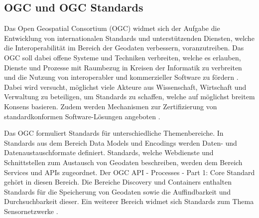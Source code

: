 \subsection{OGC und OGC Standards}
Das Open Geospatial Consortium (OGC) widmet sich der Aufgabe die Entwicklung von internationalen Standards und unterstützenden Diensten, welche die Interoperabilität im 
Bereich der Geodaten verbessern, voranzutreiben. Das OGC soll dabei offene Systeme und Techniken verbreiten, welche es erlauben, Dienste und Prozesse mit Raumbezug
in Kreisen der Informatik zu verbreiten und die Nutzung von interoperabler und kommerzieller Software zu fördern \cite{ogc_bylaws}. Dabei wird versucht, möglichst viele
Akteure aus Wissenschaft, Wirtschaft und Verwaltung zu beteiligen, um Standards zu schaffen, welche auf möglichst breitem Konsens basieren. Zudem werden 
Mechanismen zur Zertifizierung von standardkonformen Software-Lösungen angeboten \cite{ogc_bylaws}.

Das OGC formuliert Standards für unterschiedliche Themenbereiche. In Standards aus dem Bereich Data Models und Encodings werden Daten- und Datenaustauschformate
definiert. Standards, welche Webdienste und Schnittstellen zum Austausch von Geodaten beschreiben, werden dem Bereich Services und APIs zugeordnet. 
Der OGC API - Processes - Part 1: Core Standard gehört in diesen Bereich. Die Bereiche Discovery und Containers enthalten Standards für die Speicherung von Geodaten
sowie die Auffindbarkeit und Durchsuchbarkeit dieser. Ein weiterer Bereich widmet sich Standards zum Thema Sensornetzwerke \cite{standards_architecture_diagram}.

